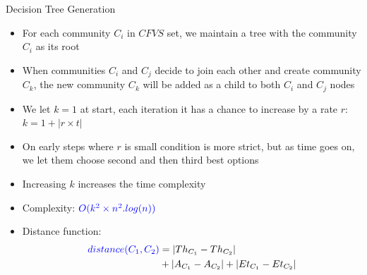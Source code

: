 \documentclass{beamer}
\begin{document}
\begin{frame}{Decision Tree Generation}

    \footnotesize
    \begin{itemize}
        \item For each community $C_i$ in $CFVS$ set, we maintain a tree with the community $C_i$ as its root
        \item When communities $C_i$ and $C_j$ decide to join each other and create community $C_k$, the new community $C_k$ will be added as a child to both $C_i$ and $C_j$ nodes
        \item We let $k = 1$ at start, each iteration it has a chance to increase by a rate $r$: $k = 1 + |r \times t|$
        \item On early steps where $r$ is small condition is more strict, but as time goes on, we let them choose second and then third best options
        \item Increasing $k$  increases the time complexity
        \item Complexity: ${\color{blue}O(k^2 \times n^2.log(n))}$
        \item Distance function:
        \begin{equation*}\label{distance_c}
            \begin{split}
                {\color{blue}distance (C_1, C_2)} & = |Th_{C_1} - Th_{C_2}| \\
                                & + |A_{C_1} - A_{C_2}| + |Et_{C_1} - Et_{C_2}|
            \end{split}
        \end{equation*}
    \end{itemize}
\end{frame}
\end{document}
